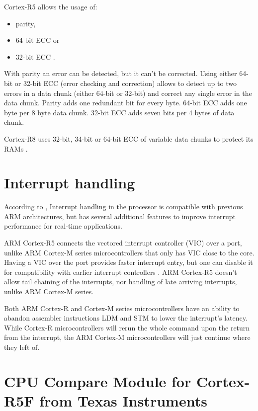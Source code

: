 Cortex-R5 allows the usage of:
\begin{itemize}

    \item parity,
    \item 64-bit ECC or
    \item 32-bit ECC \citep{cortex_r5_reference_manual}.
\end{itemize}

With parity an error can be detected, but it can't be corrected. Using either 64-bit or 32-bit ECC (error checking and correction) allows to detect up to two errors in a data chunk (either 64-bit or 32-bit) and correct any single error in the data chunk. Parity adds one redundant bit for every byte. 64-bit ECC adds one byte per 8 byte data chunk. 32-bit ECC adds seven bits per 4 bytes of data chunk. 

Cortex-R8 uses 32-bit, 34-bit or 64-bit ECC of variable data chunks to protect its RAMs \citep{cortex_r8_reference_manual}.

\section{Interrupt handling}

According to \citep{cortex_r5_reference_manual}, Interrupt handling in the processor is compatible with previous ARM architectures, but has
several additional features to improve interrupt performance for real-time applications.

ARM Cortex-R5 connects the vectored interrupt controller (VIC) over a port, unlike ARM Cortex-M series microcontrollers that only has VIC close to the core. Having a VIC over the port provides faster interrupt entry, but one can disable it for compatibility with earlier interrupt controllers \citep{cortex_r5_reference_manual}. ARM Cortex-R5 doesn't allow tail chaining of the interrupts, nor handling of late arriving interrupts, unlike ARM Cortex-M series. 

Both ARM Cortex-R and Cortex-M series microcontrollers have an ability to abandon assembler instructions LDM and STM to lower the interrupt's latency. While Cortex-R microcontrollers will rerun the whole command upon the return from the interrupt, the ARM Cortex-M microcontrollers will just continue where they left of.

 

\section{CPU Compare Module for Cortex-R5F from Texas Instruments}

